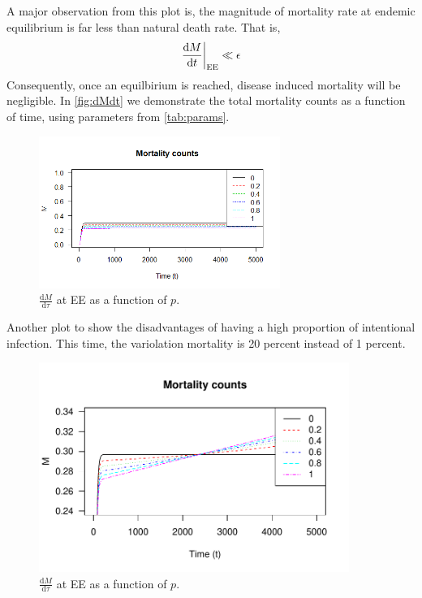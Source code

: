 \documentclass[12pt]{article}
\newcommand\dbyd[2]{\frac{\mathrm d{#1}}{\mathrm d{#2}}}
\begin{document}
A major observation from this plot is, the magnitude of mortality rate at endemic equilibrium is far less than natural death rate. That is,
\begin{equation}
\left. \dbyd{M}{t}\right|_{\rm EE} \ll \epsilon 
\end{equation}
Consequently, once an equilbirium is reached, disease induced mortality will be negligible.  In \autoref{fig:dMdt} we demonstrate the total mortality counts as a function of time, using parameters from \autoref{tab:params}.
\begin{figure}[H]
  \centering
  \includegraphics[width=0.7\textwidth]{Figures/Mortality_counts.png}
  \caption{$\dbyd{M}{\tau}$ at EE as a function of $p$.}
\label{fig:dMdt}
\end{figure}

Another plot to show the disadvantages of having a high proportion of intentional infection. This time, the variolation mortality is 20 percent instead of 1 percent.
\begin{figure}[H]
  \centering
  \includegraphics[width=0.9\textwidth]{Figures/Rplot.pdf}
  \caption{$\dbyd{M}{\tau}$ at EE as a function of $p$.}
\label{fig:dMdt}
\end{figure}
\end{document}
